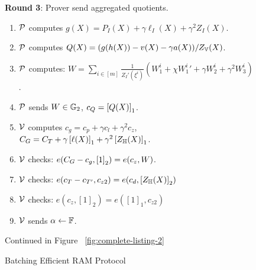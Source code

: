 \begin{figure}[t!]
\begin{mdframed}
        {\bf Round 3}: Prover send aggregated quotients.
        \begin{enumerate}[leftmargin=1em, label=\arabic*.]
            \item $\mathcal{P}$ computes $g(X)=P_I(X) + \gamma \ell_I(X) + \gamma^2 Z_I(X)$.
            \item $\mathcal{P}$ computes $Q(X) = (g(h(X)) - v(X) -\gamma a(X))/Z_{\mathbb{V}}(X)$.
            \item $\mathcal{P}$ computes: $W = \sum_{i\in [m]} \frac{1}{Z_I'(\xi^i)} (W_1^i + \chi {W_1^i}' + \gamma W_2^i + \gamma^2 W_3^i)$.
            \item $\mathcal{P}$ sends $W\in \mathbb{G}_2$, $c_Q=\left[{Q(X)}\right]_1$.
            \item $\mathcal{V}$ computes $c_g = c_p + \gamma c_l + \gamma^2 c_z$, $C_G = C_T + \gamma\left[{\ell(X)}\right]_1+\gamma^2\left[{Z_\mathbb{H}(X)}\right]_1$.
            \item $\mathcal{V}$ checks: $e(C_G - c_g, \left[{1}\right]_2)=e(c_z, W)$.
            \item $\mathcal{V}$ checks: $e(c_T-c_{T'}, c_{z2})=e(c_d, \left[{Z_\mathbb{H}(X)}\right]_2)$
            \item $\mathcal{V}$ checks: $e(c_z, [1]_2)=e([1]_1, c_{z2})$
            \item $\mathcal{V}$ sends $\alpha\gets \mathbb{F}$.
        \end{enumerate}

        Continued in Figure ~\ref{fig:complete-listing-2}
    \end{mdframed}
    \caption{Batching Efficient RAM Protocol}
    \label{fig:complete-listing}
\end{figure}

